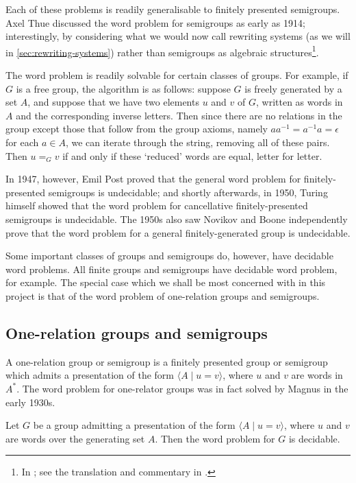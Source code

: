 \documentclass[noindex,noinsetproof,12pt]{lmaths}
\begin{document}
Each of these problems is readily generalisable to finitely presented semigroups. Axel Thue discussed the word problem for semigroups as early as 1914; interestingly, by considering what we would now call rewriting systems (as we will in \cref{sec:rewriting-systems}) rather than semigroups as algebraic structures\footnote{In \cite{Thue1914}; see the translation and commentary in \cite{Power2013}.}.

The word problem is readily solvable for certain classes of groups. For example, if $G$ is a free group, the algorithm is as follows: suppose $G$ is freely generated by a set $A$, and suppose that we have two elements $u$ and $v$ of $G$, written as words in $A$ and the corresponding inverse letters. Then since there are no relations in the group except those that follow from the group axioms, namely $aa^{-1} = a^{-1}a = \epsilon$ for each $a \in A$, we can iterate through the string, removing all of these pairs. Then $u =_G v$ if and only if these `reduced' words are equal, letter for letter.

In 1947, however, Emil Post proved that the general word problem for finitely-presented semigroups is undecidable; and shortly afterwards, in 1950, Turing himself showed that the word problem for cancellative finitely-presented semigroups is undecidable. The 1950s also saw Novikov and Boone independently prove that the word problem for a general finitely-generated group is undecidable.

Some important classes of groups and semigroups do, however, have decidable word problems. All finite groups and semigroups have decidable word problem, for example. The special case which we shall be most concerned with in this project is that of the word problem of one-relation groups and semigroups.

\subsection{One-relation groups and semigroups} \label{sec:one-relation-overview}

A one-relation group or semigroup is a finitely presented group or semigroup which admits a presentation of the form $\langle A \mid u = v\rangle$, where $u$ and $v$ are words in $A^*$. The word problem for one-relator groups was in fact solved by Magnus in the early 1930s.

\begin{theorem}[Magnus, 1932] \label{thm:orgp-decidablewp}
	Let $G$ be a group admitting a presentation of the form $\langle A \mid u = v\rangle$, where $u$ and $v$ are words over the generating set $A$. Then the word problem for $G$ is decidable.
\end{theorem}
\end{document}
